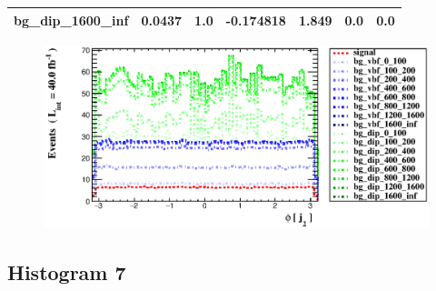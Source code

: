 \documentclass[a4paper, 10pt]{article}
\begin{document}
\begin{table}[H]
\begin{center}
\begin{tabular}{|m{23.0mm}|m{23.0mm}|m{18.0mm}|m{19.0mm}|m{19.0mm}|m{19.0mm}|m{19.0mm}|}
      \hline
      {\cellcolor{white}         bg\_dip\_1600\_inf}& {\cellcolor{white}         0.0437}& {\cellcolor{white}         1.0}& {\cellcolor{white}         -0.174818}& {\cellcolor{white}         1.849}& {\cellcolor{green}         0.0}& {\cellcolor{green}         0.0}\\
\hline
    \end{tabular}
  \end{center}
\end{table}

\begin{figure}[H]
  \begin{center}
    \includegraphics[scale=0.45]{selection_5.eps}\\
\caption{   }
  \end{center}
\end{figure}
      \newpage
\subsection{ Histogram 7}
\end{document}

